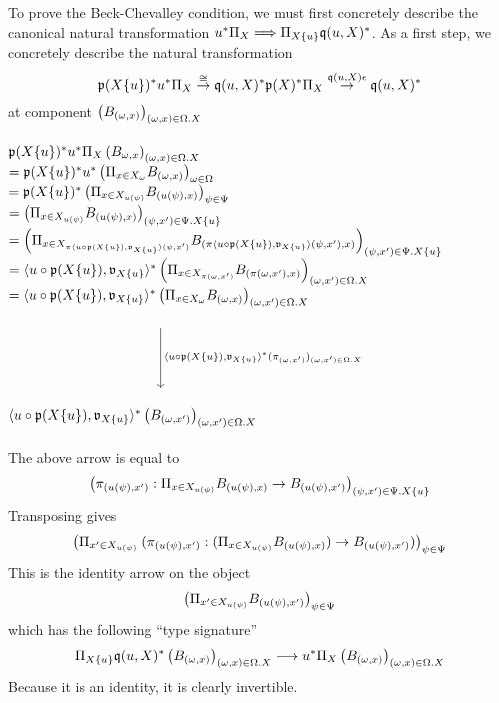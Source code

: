 \documentclass[sigplan,10pt,review,anonymous]{acmart}
\newcommand{\fm}[2]{
\left(
\tiny
#1
\normalsize
\right)_{#2}
}
\begin{document}
To prove the Beck-Chevalley condition, we must first concretely describe the canonical natural transformation $u^* \Pi_X \Longrightarrow \Pi_{X \{ u \}} \frak q(u,X)^*$. As a first step, we concretely describe the natural transformation
$$\frak p(X \{u \})^* u^* \Pi_X \overset{\cong}{\to} \frak q(u,X)^* \frak p(X)^* \Pi_X \overset{\frak q(u,X) \epsilon}{\to} \frak q(u,X)^*$$
at component $\fm{B_{(\omega,x)}}{(\omega,x) \in \Omega.X}$\\~\\
$\frak p(X \{ u \})^* u^* \Pi_X \fm{B_{\omega,x}}{(\omega,x) \in \Omega.X}$\\
$= \frak p(X \{ u \})^* u^* \fm{\Pi_{x \in X_\omega} B_{(\omega,x)}}{\omega \in \Omega}$\\
$= \frak p(X \{ u \})^* \fm{\Pi_{x \in X_{u(\psi)}} B_{(u(\psi),x)}}{\psi \in \Psi}$\\
$= \fm{\Pi_{x \in X_{u(\psi)}} B_{(u(\psi),x)}}{(\psi,x') \in \Psi . X \{ u \}}$ \\
$= \fm{\Pi_{x \in X_{\pi \langle u \circ \frak p(X \{ u \})  , \frak v_{X \{ u \}} \rangle (\psi,x')}} B_{(\pi \langle u \circ \frak p(X \{ u \})  , \frak v_{X \{ u \}} \rangle (\psi,x'),x)}}{(\psi,x') \in \Psi . X \{ u \}}$\\
$= \langle u \circ \frak p(X \{ u \})  , \frak v_{X \{ u \}} \rangle^* \fm{\Pi_{x \in X_{\pi (\omega,x')}} B_{(\pi (\omega,x'),x)}}{(\omega,x') \in \Omega . X}$\\
\vspace{1.5ex} $= \langle u \circ \frak p(X \{ u \})  , \frak v_{X \{ u \}} \rangle^* \fm{\Pi_{x \in X_\omega} B_{(\omega,x)}}{(\omega,x') \in \Omega . X}$
\[\begin{tikzcd}
	{} \\
	{} \\
	\arrow["{\langle u \circ \frak p(X \{ u \}), \frak v_{X \{u \}}\rangle^*(\pi_{(\omega, x')})_{(\omega, x') \in \Omega . X}}", from=1-1, to=3-1]
\end{tikzcd}\]
$\langle u \circ \frak p(X \{ u \})  , \frak v_{X \{ u \}} \rangle^* \fm{B_{(\omega,x')}}{(\omega,x') \in \Omega . X}$
\\~\\
The above arrow is equal to 
$$\fm{\pi_{(u(\psi),x')} : \Pi_{x \in X_{u(\psi)}} B_{(u(\psi),x)} \to B_{(u(\psi),x')}}{(\psi, x') \in \Psi . X \{ u \}}$$
Transposing gives
$$\fm{\Pi_{x' \in X_{u(\psi)}}~(\pi_{(u(\psi),x')} : (\Pi_{x \in X_{u(\psi)}} B_{(u(\psi),x)}) \to B_{(u(\psi),x')})}{\psi \in \Psi}$$
This is the identity arrow on the object 
$$\fm{\Pi_{x' \in X_{u(\psi)}} B_{(u(\psi), x')}}{\psi \in \Psi}$$
which has the following ``type signature'' 
$$\Pi_{X \{ u \}} \frak q(u, X)^* \fm{B_{(\omega,x)}}{(\omega,x) \in \Omega . X} \longrightarrow u^* \Pi_X \fm{B_{(\omega,x)}}{(\omega,x) \in \Omega . X}$$
Because it is an identity, it is clearly invertible.
\end{document}
